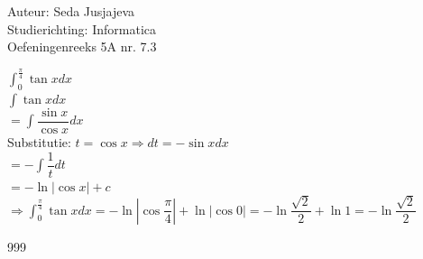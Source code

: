 \documentclass[a4paper]{article}
\newcommand{\integral}{\displaystyle\int}
\begin{document}
\noindent \large Auteur: Seda Jusjajeva\\
\noindent \large Studierichting: Informatica\\
\noindent \large Oefeningenreeks 5A nr. 7.3\\

\medskip

\normalsize


$\integral_{0}^{\tfrac{\pi}{4}} \tan xdx$ \\

$\integral \tan xdx$ \\

$= \integral \dfrac{\sin x}{\cos x} dx$ \\

Substitutie: $t = \cos x \Rightarrow dt = -\sin xdx$ \\

$= -\integral \dfrac{1}{t}dt$ \\

$= -\ln \left|\cos x\right| + c$ \\

$\Rightarrow\integral_{0}^{\tfrac{\pi}{4}} \tan xdx = -\ln \left|\cos \dfrac{\pi}{4}\right| + \ln \left|\cos 0\right| = -\ln \dfrac{\sqrt{2}}{2} + \ln 1 = -\ln \dfrac{\sqrt{2}}{2}$ \\




\begin{thebibliography}{999}
\end{thebibliography}
\end{document}
